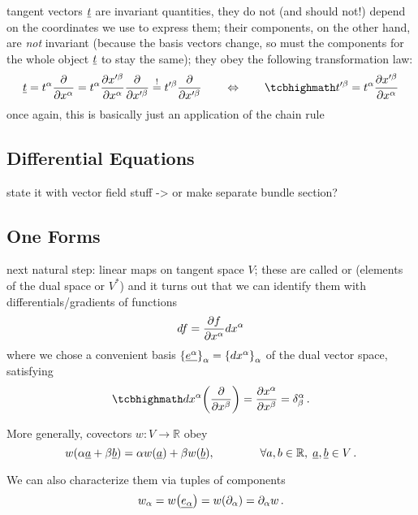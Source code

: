 \documentclass[../relativity_main.tex]{subfiles}
\begin{document}
tangent vectors $\underline{t}$ are invariant quantities, they do not (and should not!) depend on the coordinates we use to express them; their components, on the other hand, are \emph{not} invariant (because the basis vectors change, so must the components for the whole object $\underline{t}$ to stay the same); they obey the following transformation law:
\begin{equation}\label{eq:vec_trafo}
\fvec{t} = t^\alpha \pdv{x^\alpha} = t^\alpha \pdv{x'^\beta}{x^\alpha} \pdv{x'^\beta} \overset{!}{=} t'^\beta \pdv{x'^\beta}
\qquad \Leftrightarrow \qquad
\eqbox{
t'^\beta = t^\alpha \pdv{x'^\beta}{x^\alpha}
}
\end{equation}
once again, this is basically just an application of the chain rule



		\subsection{Differential Equations}
state it with vector field stuff -> or make separate bundle section?



		\subsection{One Forms}
next natural step: linear maps on tangent space $V$; these are called  or  (elements of the dual space or  $V^*$) and it turns out that we can identify them with differentials/gradients of functions
\begin{equation}
df = \pdv{f}{x^\alpha} dx^\alpha
\end{equation}
where we chose a convenient basis $\qty{\underline{e^\alpha}}_\alpha = \qty{dx^\alpha}_\alpha$ of the dual vector space, satisfying
\begin{equation}
\eqbox{
dx^\alpha\qty(\pdv{x^\beta}) = \pdv{x^\alpha}{x^\beta} = \delta^\alpha_\beta
} \, .
\end{equation}

More generally, covectors $w: V \rightarrow \mathbb{R}$ obey
\begin{equation}
w\qty(\alpha \underline{a} + \beta \underline{b}) = \alpha w\qty(\underline{a}) + \beta w\qty(\underline{b}), \qquad \qquad \forall a, b \in \mathbb{R}, \; \underline{a}, \underline{b} \in V \, .
\end{equation}


We can also characterize them via tuples of components
\begin{equation}
w_\alpha = w\qty(\underline{e_\alpha}) = w\qty(\partial_\alpha) = \partial_\alpha w \, .
\end{equation}
\end{document}
